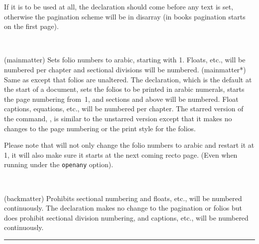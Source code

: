     If it is to be used at all, the \cmd{\frontmatter} declaration should
come before any text is set, otherwise the pagination scheme will be
in disarray (in books pagination starts on the first page).

\begin{syntax}
\cmd{\mainmatter} \cmd{\mainmatter*} \\
\end{syntax}
\glossary(mainmatter)%
  {}%
  {Sets folio numbers to arabic, starting with 1. Floats, etc., will be
   numbered per chapter and sectional divisions will be numbered.}
\glossary(mainmatter*)%
  {}%
  {Same as  except that folios are unaltered.}
The \cmd{\mainmatter} declaration, which is the default at the start of a 
document, sets the folios to be printed in arabic numerals, starts 
the page numbering from~1, and sections and above will be numbered. 
Float captions, equations, etc., will be numbered 
per chapter. The starred version of the command,
\cmd{\mainmatter*}, is similar to the unstarred version except that it
makes no changes to the page numbering or the print style for the 
folios.

Please note that \cmd{\mainmatter} will not only change the folio
numbers to arabic and restart it at 1, it will also make sure it
starts at the next coming recto page. (Even when running under the
\texttt{openany} option).



\begin{syntax}
\cmd{\backmatter} \\
\end{syntax}
\glossary(backmatter)%
  {}%
  {Prohibits sectional numbering and floats, etc., will be numbered continuously.}
The \cmd{\backmatter} declaration makes no change to the pagination or 
folios but does prohibit sectional division numbering, and 
captions, etc., will be numbered continuously.

\fancybreak{}


